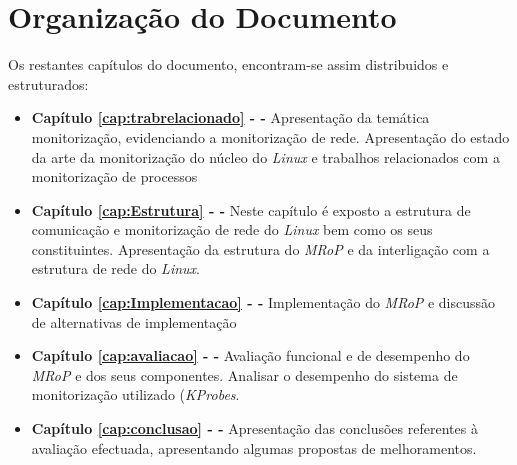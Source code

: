 \bigskip 


\section{Organização do Documento}
\label{sec:intro_document_outline}

Os restantes capítulos do documento, encontram-se assim distribuidos e estruturados:

\begin{itemize}
	\item \textbf{Capítulo \ref{cap:trabrelacionado} -  - } Apresentação da temática monitorização, evidenciando a monitorização de rede. Apresentação do estado da arte da monitorização do núcleo do \textit{Linux} e trabalhos relacionados com a monitorização de processos

	\item \textbf{Capítulo \ref{cap:Estrutura} -   - } Neste capítulo é exposto a estrutura de comunicação e monitorização de rede do \textit{Linux} bem como os seus constituintes. Apresentação da estrutura do \textit{MRoP} e da interligação com a estrutura de rede do \textit{Linux}.

	\item \textbf{Capítulo \ref{cap:Implementacao} -  - } Implementação do \textit{MRoP} e discussão de alternativas de implementação

	\item \textbf{Capítulo \ref{cap:avaliacao} -  - } Avaliação funcional e de desempenho do \textit{MRoP} e dos seus componentes. Analisar o desempenho do sistema de monitorização utilizado (\textit{KProbes}.

	\item \textbf{Capítulo \ref{cap:conclusao} -  - } Apresentação das conclusões referentes à avaliação efectuada, apresentando algumas propostas de melhoramentos.

\end{itemize}
